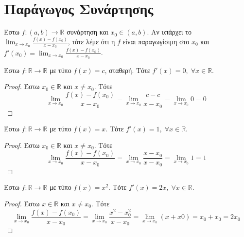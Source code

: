 \documentclass[a4paper,table]{report}
\begin{document}
\section{Παράγωγος Συνάρτησης}

\begin{dfn}
  Έστω $ f \colon (a,b) \to \mathbb{R} $ συνάρτηση και $ x_{0} \in (a,b) $. Αν 
  υπάρχει το $ \lim_{x \to x_{0}} \frac{f(x) - f(x_{0})}{x - x_{0}}$, τότε λέμε ότι 
  η $f$ είναι παραγωγίσιμη στο $ x_{0} $ και $ f'(x_{0}) = \lim_{x \to x_{0}} 
  \frac{f(x)-f(x_{0})}{x- x_{0}} $.
\end{dfn}

\begin{prop}
  Έστω $ f \colon \mathbb{R} \to \mathbb{R} $ με τύπο $ f(x)=c $, σταθερή. Τότε 
  $ f'(x) = 0, \; \forall x \in \mathbb{R} $. 
\end{prop}

\begin{proof}
  Έστω $ x_{0} \in \mathbb{R} $ και $ x \neq x_{0} $. Τότε
  \[
    \lim_{x \to x_{0}}  \frac{f(x) - f(x_{0})}{x - x_{0}} = \lim_{x \to x_{0}} 
    \frac{c - c}{x - x_{0}} = \lim_{x \to x_{0}} 0 = 0
  \] 

\end{proof}

\begin{prop}
  Έστω $ f \colon \mathbb{R} \to \mathbb{R} $ με τύπο $ f(x)=x $. Τότε 
  $ f'(x) = 1, \; \forall x \in \mathbb{R} $. 
\end{prop}

\begin{proof}
  Έστω $ x_{0} \in \mathbb{R} $ και $ x \neq x_{0} $. Τότε
  \[
    \lim_{x \to x_{0}} \frac{f(x) - f(x_{0})}{x - x_{0}} = \lim_{x \to x_{0}} 
    \frac{x - x_{0}}{x - x_{0}} = \lim_{x \to x_{0}} 1 = 1
  \] 

\end{proof}

\begin{prop}
  Έστω $ f \colon \mathbb{R} \to \mathbb{R} $ με τύπο $ f(x)=x^{2} $. Τότε 
  $ f'(x) = 2x, \; \forall x \in \mathbb{R} $. 
\end{prop}

\begin{proof}
  Έστω $ x \in \mathbb{R} $ και $ x \neq x_{0} $. Τότε 
  \[
    \lim_{x \to x_{0}} \frac{f(x) - f(x_{0})}{x- x_{0}} = \lim_{x \to x_{0}} 
    \frac{x^{2} - x_{0}^{2}}{x - x_{0}} = \lim_{x \to x_{0}} (x+x0) = x_{0}+ x_{0}
    = 2 x_{0}
  \] 
\end{proof}
\end{document}
